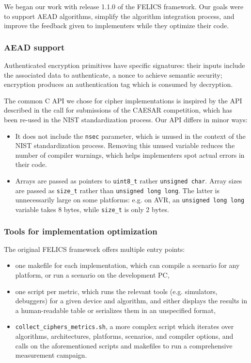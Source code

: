 \documentclass{article}
\begin{document}
We began our work with release 1.1.0 of the FELICS framework.  Our
goals were to support AEAD algorithms, simplify the algorithm
integration process, and improve the feedback given to implementers
while they optimize their code.

\subsubsection{AEAD support}
\label{sec:felics-ae/aead-support}

Authenticated encryption primitives have specific signatures: their
inputs include the associated data to authenticate, a nonce to achieve
semantic security\cite{Rogaway:AEAD}; encryption produces an
authentication tag which is consumed by decryption.

The common C API we chose for cipher implementations is inspired by
the API described in the call for submissions of the CAESAR
competition\cite{CAESAR:call}, which has been re-used in the NIST
standardization process\cite{NIST:LWC-requirements}.  Our API differs
in minor ways:

\begin{itemize}
\item It does not include the \texttt{nsec} parameter, which is unused
  in the context of the NIST standardization process.  Removing this
  unused variable reduces the number of compiler warnings, which helps
  implementers spot actual errors in their code.
\item Arrays are passed as pointers to \texttt{uint8\_t} rather
  \texttt{unsigned char}.  Array sizes are passed as \texttt{size\_t}
  rather than \texttt{unsigned long long}.  The latter is
  unnecessarily large on some platforms: e.g. on AVR, an
  \texttt{unsigned long long} variable takes 8 bytes, while
  \texttt{size\_t} is only 2 bytes.
\end{itemize}

\subsubsection{Tools for implementation optimization}
\label{sec:felics-ae/tools-opt}

The original FELICS framework offers multiple entry points:

\begin{itemize}
\item one makefile for each implementation, which can compile a
  scenario for any platform, or run a scenario on the development PC,
\item one script per metric, which runs the relevant tools
  (e.g. simulators, debuggers) for a given device and algorithm, and
  either displays the results in a human-readable table or serializes
  them in an unspecified format,
\item \texttt{collect\_ciphers\_metrics.sh}, a more complex script
  which iterates over algorithms, architectures, platforms, scenarios,
  and compiler options, and calls on the aforementioned scripts and
  makefiles to run a comprehensive measurement campaign.
\end{itemize}
\end{document}

